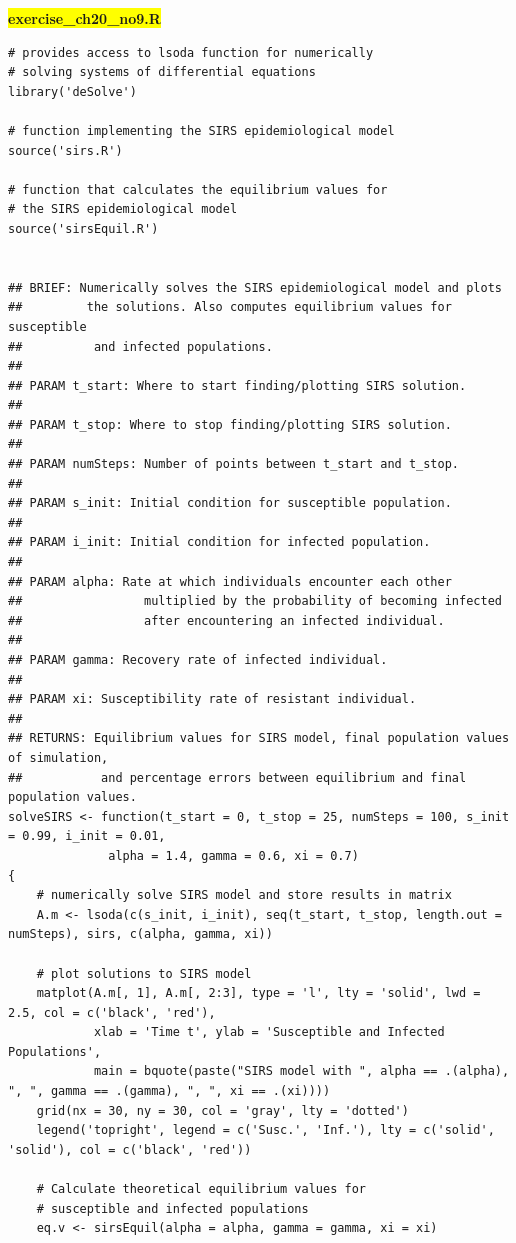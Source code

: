 \documentclass[11pt]{article}
\newcommand{\mybox}{%
    \collectbox{%
        \setlength{\fboxsep}{2pt}%
        \fbox{\BOXCONTENT}%
    }%
}
\begin{document}
\noindent\mybox{\colorbox{yellow}{\textbf{exercise\_ch20\_no9.R}}}\hspace{3mm}\hrulefill
\begin{lstlisting}
# provides access to lsoda function for numerically
# solving systems of differential equations
library('deSolve')

# function implementing the SIRS epidemiological model
source('sirs.R')

# function that calculates the equilibrium values for
# the SIRS epidemiological model
source('sirsEquil.R')


## BRIEF: Numerically solves the SIRS epidemiological model and plots
##         the solutions. Also computes equilibrium values for susceptible
##	        and infected populations.
##
## PARAM t_start: Where to start finding/plotting SIRS solution.
##
## PARAM t_stop: Where to stop finding/plotting SIRS solution.
##
## PARAM numSteps: Number of points between t_start and t_stop.
##
## PARAM s_init: Initial condition for susceptible population.
##
## PARAM i_init: Initial condition for infected population.
##
## PARAM alpha: Rate at which individuals encounter each other
##	               multiplied by the probability of becoming infected
##	               after encountering an infected individual.
##
## PARAM gamma: Recovery rate of infected individual.
##
## PARAM xi: Susceptibility rate of resistant individual.
##
## RETURNS: Equilibrium values for SIRS model, final population values of simulation, 
##           and percentage errors between equilibrium and final population values.
solveSIRS <- function(t_start = 0, t_stop = 25, numSteps = 100, s_init = 0.99, i_init = 0.01, 
		      alpha = 1.4, gamma = 0.6, xi = 0.7)
{
	# numerically solve SIRS model and store results in matrix
	A.m <- lsoda(c(s_init, i_init), seq(t_start, t_stop, length.out = numSteps), sirs, c(alpha, gamma, xi)) 
	
	# plot solutions to SIRS model	
	matplot(A.m[, 1], A.m[, 2:3], type = 'l', lty = 'solid', lwd = 2.5, col = c('black', 'red'), 
	        xlab = 'Time t', ylab = 'Susceptible and Infected Populations',
	        main = bquote(paste("SIRS model with ", alpha == .(alpha), ", ", gamma == .(gamma), ", ", xi == .(xi))))
	grid(nx = 30, ny = 30, col = 'gray', lty = 'dotted')
	legend('topright', legend = c('Susc.', 'Inf.'), lty = c('solid', 'solid'), col = c('black', 'red'))
	
	# Calculate theoretical equilibrium values for 
	# susceptible and infected populations
	eq.v <- sirsEquil(alpha = alpha, gamma = gamma, xi = xi)
	

\end{lstlisting}
\end{document}
